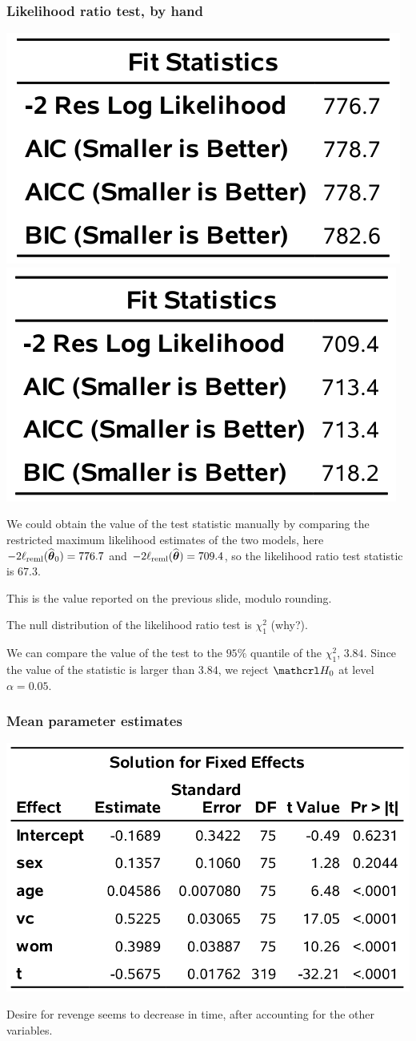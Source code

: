 \documentclass{beamer}
\begin{document}
\begin{frame}[fragile]
\frametitle{Likelihood ratio test, by hand}
\begin{center}
\includegraphics[width = 0.35\linewidth]{img/c5/slides6-e10}
\includegraphics[width = 0.35\linewidth]{img/c5/slides6-e11}
\end{center}
\bi 
\item We could obtain the value of the test statistic manually by comparing the restricted maximum likelihood estimates of the two models, here $-2\ell_{\textrm{reml}}(\widehat{\boldsymbol {\theta}}_0)=776.7$ and $-2\ell_{\textrm{reml}}(\widehat{\boldsymbol {\theta}})=709.4$, so the likelihood ratio test statistic is $67.3$. 
\bi
\item {\footnotesize This is the value reported on the previous slide, modulo rounding. }
\ei 
\item The null distribution of the likelihood ratio test is $\chi^2_1$ (why?).
\item We can compare the value of the test to the $95\%$ quantile of the $\chi^2_1$, $3.84$. Since the value of the statistic is larger than $3.84$,  we reject $\Hy_0$ at level $\alpha=0.05$.
\ei
\end{frame}

\begin{frame}[fragile]
\frametitle{Mean parameter estimates}
\begin{center}
\includegraphics[width = 0.7\linewidth]{img/c5/slides6-e12}
\end{center}
Desire for revenge seems to decrease in time, after accounting for the other variables.
\end{frame}
\end{document}
